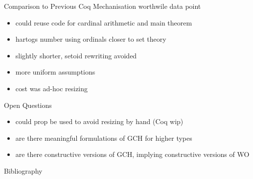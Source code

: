 \documentclass[xcolor=dvipsnames,compress,aspectratio=169,handout]{beamer}
\begin{document}
\begin{frame}{Comparison to Previous Coq Mechanisation}
	worthwile data point
	\begin{itemize}
		\item
		could reuse code for cardinal arithmetic and main theorem
		\item
		hartogs number using ordinals closer to set theory
		\item
		slightly shorter, setoid rewriting avoided
		\item
		more uniform assumptions
		\item
		cost was ad-hoc resizing
	\end{itemize}
\end{frame}

\begin{frame}{Open Questions}
	\begin{itemize}
		\item
		could prop be used to avoid resizing by hand (Coq wip)
		\item
		are there meaningful formulations of GCH for higher types
		\item
		are there constructive versions of GCH, implying constructive versions of WO
	\end{itemize}
\end{frame}



\begin{frame}{Bibliography}
\small


\end{frame}
\end{document}
